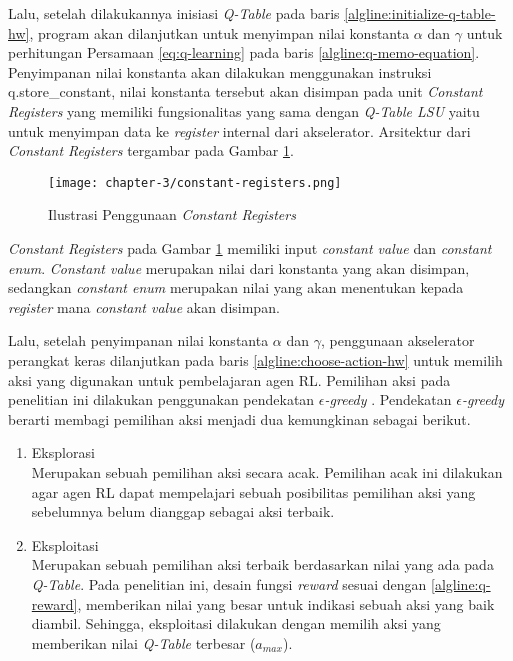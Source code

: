 Lalu, setelah dilakukannya inisiasi \textit{Q-Table} pada baris \ref{algline:initialize-q-table-hw}, program akan dilanjutkan untuk menyimpan nilai konstanta $\alpha$ dan $\gamma$ untuk perhitungan Persamaan \ref{eq:q-learning} pada baris \ref{algline:q-memo-equation}. Penyimpanan nilai konstanta akan dilakukan menggunakan instruksi q.store\_constant, nilai konstanta tersebut akan disimpan pada unit \textit{Constant Registers} yang memiliki fungsionalitas yang sama dengan \textit{Q-Table \ac{LSU}} yaitu untuk menyimpan data ke \textit{register} internal dari akselerator. Arsitektur dari \textit{Constant Registers} tergambar pada Gambar \ref{fig:constant-registers}.

\begin{figure}[H]
	\centering
	\texttt{[image: chapter-3/constant-registers.png]}
	\caption{Ilustrasi Penggunaan \textit{Constant Registers}}
	\label{fig:constant-registers}
\end{figure}

\textit{Constant Registers} pada Gambar \ref{fig:constant-registers} memiliki input \textit{constant value} dan \textit{constant enum}. \textit{Constant value} merupakan nilai dari konstanta yang akan disimpan, sedangkan \textit{constant enum} merupakan nilai yang akan menentukan kepada \textit{register} mana \textit{constant value} akan disimpan.

Lalu, setelah penyimpanan nilai konstanta $\alpha$ dan $\gamma$, penggunaan akselerator perangkat keras dilanjutkan pada baris \ref{algline:choose-action-hw} untuk memilih aksi yang digunakan untuk pembelajaran agen \ac{RL}. Pemilihan aksi pada penelitian ini dilakukan penggunakan pendekatan \textit{$\epsilon$-greedy} \parencite{christopher1989learning}. Pendekatan \textit{$\epsilon$-greedy} berarti membagi pemilihan aksi menjadi dua kemungkinan sebagai berikut.

\begin{enumerate}
	\item Eksplorasi\\
	      Merupakan sebuah pemilihan aksi secara acak. Pemilihan acak ini dilakukan agar agen \ac{RL} dapat mempelajari sebuah posibilitas pemilihan aksi yang sebelumnya belum dianggap sebagai aksi terbaik.
	\item Eksploitasi\\
	      Merupakan sebuah pemilihan aksi terbaik berdasarkan nilai yang ada pada \textit{Q-Table}. Pada penelitian ini, desain fungsi \textit{reward} sesuai dengan \ref{algline:q-reward}, memberikan nilai yang besar untuk indikasi sebuah aksi yang baik diambil. Sehingga, eksploitasi dilakukan dengan memilih aksi yang memberikan nilai \textit{Q-Table} terbesar ($a_{max}$).
\end{enumerate}

